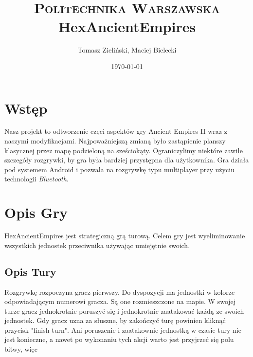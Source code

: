\documentclass[paper=a4, fontsize=11pt]{scrartcl} %
\title{	
\normalfont \normalsize 
\textsc{Politechnika Warszawska} \\ [25pt] %
\huge HexAncientEmpires \\ %
}
\author{Tomasz Zieliński,  Maciej Bielecki}
\date{\normalsize\today}
\numberwithin{equation}{section} %
\numberwithin{figure}{section} %
\numberwithin{table}{section} %
\begin{document}
\maketitle 

\section{Wstęp}
Nasz projekt to odtworzenie częci aspektów gry Ancient Empires II wraz z naszymi modyfikacjami. Najpoważniejszą zmianą było zastąpienie planszy klasycznej przez mapę podzieloną na sześciokąty. Ograniczylimy niektóre zawiłe szczegóły rozgrywki, by gra była bardziej przystępna dla użytkownika. Gra działa pod systemem Android i pozwala na rozgrywkę typu multiplayer przy użyciu technologii \textit{Bluetooth}.

\section{Opis Gry}
HexAncientEmpires jest strategiczną grą turową. Celem gry jest wyeliminowanie wszystkich jednostek przeciwnika używając umiejętnie swoich.
\subsection{Opis Tury}
Rozgrywkę rozpoczyna gracz pierwszy. Do dyspozycji ma jednostki w kolorze odpowiadającym numerowi gracza. Są one rozmieszczone na mapie.
 W swojej turze gracz jednokrotnie poruszyć się i jednokrotnie zaatakować każdą ze swoich jednostek. Gdy gracz uzna za słuszne, by zakończyć turę powinien kliknąć przycisk "finish turn". Ani poruszenie i zaatakownie jednostką w czasie tury nie jest konieczne, a nawet po wykonaniu tych akcji warto jest przyjrzeć się polu bitwy, więc 
\end{document}
